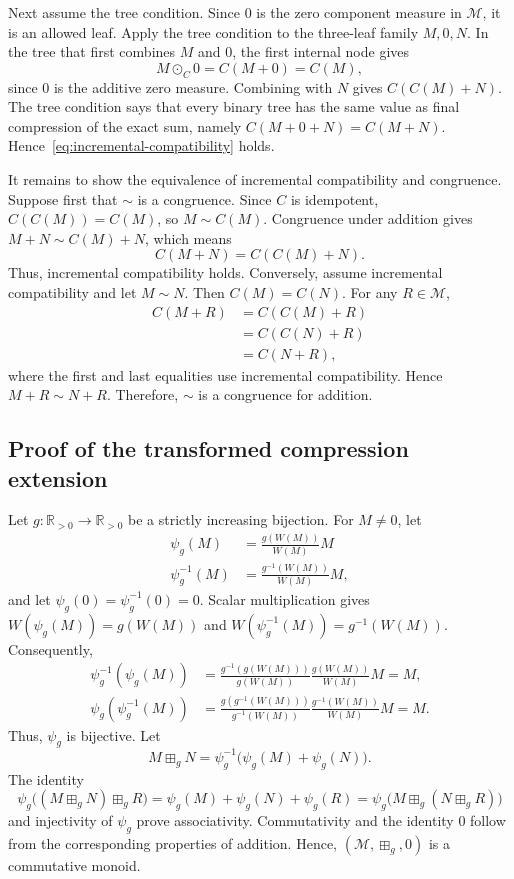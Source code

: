 \documentclass[runningheads]{llncs}
\newcommand{\R}{\mathbb{R}}
\begin{document}
Next assume the tree condition. Since $0$ is the zero component measure in $\mathcal M$, it is an allowed leaf. Apply the tree condition to the three-leaf family $M,0,N$. In the tree that first combines $M$ and $0$, the first internal node gives
\begin{equation*}
  M\odot_C0=C(M+0)=C(M),
\end{equation*}
since $0$ is the additive zero measure. Combining with $N$ gives $C(C(M)+N)$. The tree condition says that every binary tree has the same value as final compression of the exact sum, namely $C(M+0+N)=C(M+N)$. Hence~\eqref{eq:incremental-compatibility} holds.

It remains to show the equivalence of incremental compatibility and congruence. Suppose first that $\sim$ is a congruence. Since $C$ is idempotent, $C(C(M))=C(M)$, so $M\sim C(M)$. Congruence under addition gives $M+N\sim C(M)+N$, which means
\begin{equation*}
  C(M+N)=C(C(M)+N).
\end{equation*}
Thus, incremental compatibility holds. Conversely, assume incremental compatibility and let $M\sim N$. Then $C(M)=C(N)$. For any $R\in\mathcal M$,
\begin{align*}
  C(M+R)&=C(C(M)+R)\\
        &=C(C(N)+R)\\
        &=C(N+R),
\end{align*}
where the first and last equalities use incremental compatibility. Hence $M+R\sim N+R$. Therefore, $\sim$ is a congruence for addition.


\subsection*{Proof of the transformed compression extension}

Let $g:\R_{>0}\to\R_{>0}$ be a strictly increasing bijection. For $M\neq0$, let
\begin{align*}
  \psi_g(M)&=\frac{g(W(M))}{W(M)}M\\
  \psi_g^{-1}(M)&=\frac{g^{-1}(W(M))}{W(M)}M,
\end{align*}
and let $\psi_g(0)=\psi_g^{-1}(0)=0$. Scalar multiplication gives
$W(\psi_g(M))=g(W(M))$ and
$W(\psi_g^{-1}(M))=g^{-1}(W(M))$. Consequently,
\begin{align*}
 \psi_g^{-1}(\psi_g(M))
 &=\frac{g^{-1}(g(W(M)))}{g(W(M))}
   \frac{g(W(M))}{W(M)}M=M,\\
 \psi_g(\psi_g^{-1}(M))
 &=\frac{g(g^{-1}(W(M)))}{g^{-1}(W(M))}
   \frac{g^{-1}(W(M))}{W(M)}M=M.
\end{align*}
Thus, $\psi_g$ is bijective. Let
\begin{equation*}
  M\boxplus_gN=\psi_g^{-1}\!\bigl(\psi_g(M)+\psi_g(N)\bigr).
\end{equation*}
The identity
\begin{equation*}
 \psi_g\bigl((M\boxplus_gN)\boxplus_gR\bigr)
 =\psi_g(M)+\psi_g(N)+\psi_g(R)
 =\psi_g\bigl(M\boxplus_g(N\boxplus_gR)\bigr)
\end{equation*}
and injectivity of $\psi_g$ prove associativity. Commutativity and the identity
$0$ follow from the corresponding properties of addition. Hence,
$(\mathcal M,\boxplus_g,0)$ is a commutative monoid.
\end{document}
